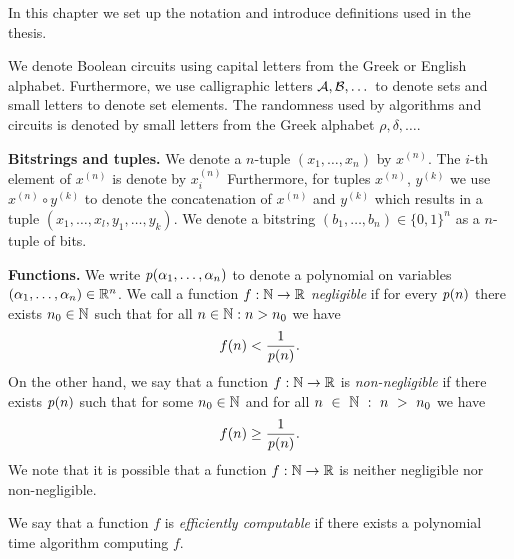 %
In this chapter we set up the notation and introduce definitions used in the thesis.

We denote Boolean circuits using capital letters from the Greek or English alphabet.
Furthermore, we use calligraphic letters $\mathcal{A}, \mathcal{B}, \dotsc$ to denote sets and small letters to denote set elements.
The randomness used by algorithms and circuits is denoted by small letters from the Greek alphabet $\rho, \delta, \dotsc$.

\textbf{Bitstrings and tuples.}
We denote a $n$-tuple $(x_1, \dotsc, x_n)$ by $x^{(n)}$. The $i$-th element of $x^{(n)}$ is denote by $x^{(n)}_i$
Furthermore, for tuples $x^{(n)}$, $y^{(k)}$ we use $x^{(n)} \circ y^{(k)}$ to denote the concatenation of $x^{(n)}$ and $y^{(k)}$ which results in
a tuple $(x_1, \dotsc, x_l, y_1, \dotsc, y_k)$.
We denote a bitstring $(b_1, \dotsc, b_n) \in \{0,1\}^{n}$ as a $n$-tuple of bits.

\textbf{Functions.}
We write $\operatorname{\mathit{p}}(\alpha_1, \dots, \alpha_n)$ to denote a polynomial on variables $(\alpha_1, \dots, \alpha_n) \in \mathbb{R}^n$.
We call a function $f: \mathbb{N} \rightarrow \mathbb{R}$ \textit{negligible} if for every $\operatorname{\mathit{p}}(n)$
there exists $n_0 \in \mathbb{N}$ such that for all $n \in \mathbb{N} : n > n_0$ we have
\begin{align*}
f(n) < \frac{1}{\operatorname{\mathit{p}}(n)}.
\end{align*}
On the other hand, we say that a function $f: \mathbb{N} \rightarrow \mathbb{R}$ is \textit{non-negligible} if
there exists $\operatorname{\mathit{p}}(n)$ such that for some $n_0 \in \mathbb{N}$ and for all $n~\in~\mathbb{N}~:~n~>~n_0$ we have
\begin{align*}
  f(n) \geq \frac{1}{\operatorname{\mathit{p}}(n)}.
\end{align*}
We note that it is possible that a function $f:\mathbb{N} \rightarrow \mathbb{R}$ is neither negligible nor non-negligible.

We say that a function $f$ is \textit{efficiently computable} if there exists a polynomial time algorithm computing $f$.

